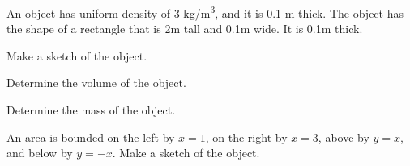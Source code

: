 \begin{problem}
\item An object has uniform density of 3 kg/m\textsuperscript{3}, and
  it is 0.1 m thick. The object has the shape of a rectangle that is
  2m tall and 0.1m wide. It is 0.1m thick.
  \begin{subproblem}
  \item Make a sketch of the object.
    \vfill
  \item Determine the volume of the object.
    \vfill
  \item Determine the mass of the object.
    \vfill
  \end{subproblem}
  \item An area is bounded on the left by $x=1$, on
  the right by $x=3$, above by $y=x$, and below by $y=-x$.
  Make a sketch of the object.
    \vfill
\end{problem}



